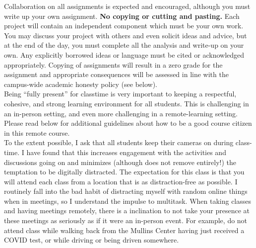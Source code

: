 \documentclass[10pt]{article}
\begin{document}

\clearpage
\bigskip
{}

 Collaboration on all assignments is expected and encouraged, although you must write up your own assignment. {\bf No copying or cutting and pasting.} Each project will contain an independent component which must be your own work. You may discuss your project with others and even solicit ideas and advice, but at the end of the day, you must complete all the analysis and write-up on your own. Any explicitly borrowed ideas or language must be cited or acknowledged appropriately. Copying of assignments will result in a zero grade for the assignment and appropriate consequences will be assessed in line with the campus-wide academic honesty policy (see below). \\


  Being ``fully present'' for classtime is very important to keeping a respectful, cohesive, and strong learning environment for all students. This is challenging in an in-person setting, and even more challenging in a remote-learning setting. Please read below for additional guidelines about how to be a good course citizen in this remote course. \\

 To the extent possible, I ask that all students keep their cameras on during class-time. I have found that this increases engagement with the activities and discussions going on and minimizes (although does not remove entirely!) the temptation to be digitally distracted. The expectation for this class is that you will attend each class from a location that is as distraction-free as possible. I routinely fall into the bad habit of distracting myself with random online things when in meetings, so I understand the impulse to multitask. When taking classes and having meetings remotely, there is a inclination to not take your presence at these meetings as seriously as if it were an in-person event. For example, do not attend class while walking back from the Mullins Center having just received a COVID test, or while driving or being driven somewhere. \\
\end{document}
